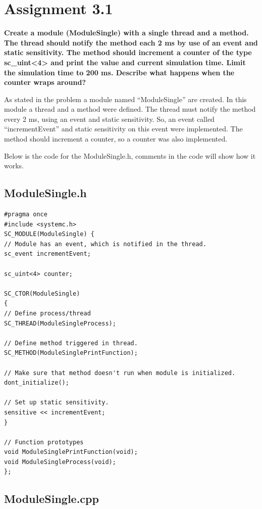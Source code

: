 
\chapter{Assignment 3.1}

\textbf{Create a module (ModuleSingle) with a single thread and a method. The thread should notify
	the method each 2 ms by use of an event and static sensitivity. The method should increment a
	counter of the type sc\_uint<4> and print the value and current simulation time. Limit the
	simulation time to 200 ms. Describe what happens when the counter wraps around?
}

As stated in the problem a module named “ModuleSingle” are created. In this module a thread and a method were defined. The thread must notify the method every 2 ms, using an event and static sensitivity. So, an event called “incrementEvent” and static sensitivity on this event were implemented. The method should increment a counter, so a counter was also implemented.

Below is the code for the ModuleSingle.h, comments in the code will show how it works. 

\section{ModuleSingle.h}
\begin{lstlisting}
#pragma once
#include <systemc.h>
SC_MODULE(ModuleSingle) {
// Module has an event, which is notified in the thread.
sc_event incrementEvent;

sc_uint<4> counter;

SC_CTOR(ModuleSingle)
{
// Define process/thread
SC_THREAD(ModuleSingleProcess);

// Define method triggered in thread.
SC_METHOD(ModuleSinglePrintFunction);

// Make sure that method doesn't run when module is initialized.
dont_initialize();

// Set up static sensitivity.
sensitive << incrementEvent;
}

// Function prototypes
void ModuleSinglePrintFunction(void);
void ModuleSingleProcess(void);
};

\end{lstlisting}






\section{ModuleSingle.cpp}

